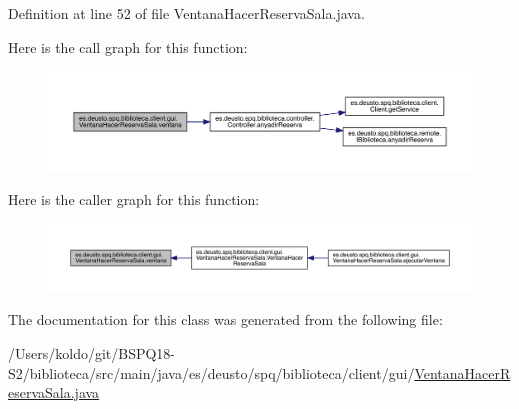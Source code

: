 Definition at line 52 of file Ventana\+Hacer\+Reserva\+Sala.\+java.

Here is the call graph for this function\+:
\nopagebreak
\begin{figure}[H]
\begin{center}
\leavevmode
\includegraphics[width=350pt]{classes_1_1deusto_1_1spq_1_1biblioteca_1_1client_1_1gui_1_1_ventana_hacer_reserva_sala_aa5d6c1cf5f1017a242410ad04c5cc876_cgraph}
\end{center}
\end{figure}
Here is the caller graph for this function\+:
\nopagebreak
\begin{figure}[H]
\begin{center}
\leavevmode
\includegraphics[width=350pt]{classes_1_1deusto_1_1spq_1_1biblioteca_1_1client_1_1gui_1_1_ventana_hacer_reserva_sala_aa5d6c1cf5f1017a242410ad04c5cc876_icgraph}
\end{center}
\end{figure}


The documentation for this class was generated from the following file\+:\begin{DoxyCompactItemize}
\item 
/\+Users/koldo/git/\+B\+S\+P\+Q18-\/\+S2/biblioteca/src/main/java/es/deusto/spq/biblioteca/client/gui/\mbox{\hyperlink{_ventana_hacer_reserva_sala_8java}{Ventana\+Hacer\+Reserva\+Sala.\+java}}\end{DoxyCompactItemize}
